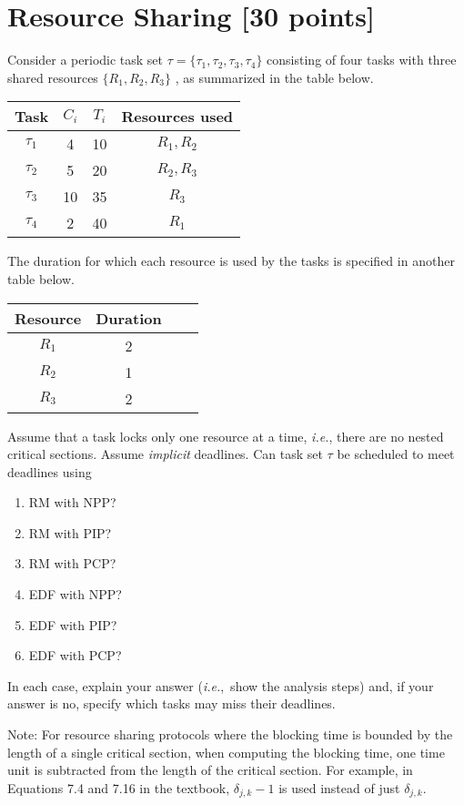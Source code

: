 \documentclass[12pt]{article}
\newcommand{\ie}{{\textit{i.e.}}}
\begin{document}
\section{Resource Sharing [30 points]}

Consider a periodic task set $\tau = \{\tau_1, \tau_2, \tau_3, \tau_4\}$
consisting of four tasks with three shared
resources $\{R_1, R_2, R_3\}$ , as summarized in the table below.
\begin{table}[h]
\begin{center}
\begin{tabular}{cccc}
\toprule
Task & $C_{i}$ & $T_{i}$ & Resources used \\ 
  \midrule
$\tau_{1}$ & 4 & 10 & $R_{1}, R_{2}$ \\
$\tau_{2}$ & 5 & 20 & $R_{2}, R_{3}$ \\
$\tau_{3}$ & 10 & 35 & $R_{3}$ \\
$\tau_{4}$ & 2 & 40 & $R_{1}$ \\ 
  \bottomrule
\end{tabular}
\end{center}
\end{table}
The duration for which each resource is used by the tasks is specified in
another table below.
\begin{table}[h]
\begin{center}
\begin{tabular}{cccc}
\toprule
Resource & Duration \\ \midrule
$R_{1}$ & 2 \\
$R_{2}$ & 1 \\
$R_{3}$ & 2 \\
\bottomrule
\end{tabular}
\end{center}
\end{table}
Assume that a task locks only one resource at a time,
\ie, there are no nested critical sections. Assume \emph{implicit} deadlines.
Can task set $\tau$ be scheduled to meet deadlines using
\begin{enumerate}
\item RM with NPP?
\item RM with PIP?
\item RM with PCP?
\item EDF with NPP?
\item EDF with PIP?
\item EDF with PCP?
\end{enumerate}
In each case, explain your answer (\ie,~show the analysis steps)
and, if your answer is no, specify which tasks may miss their deadlines.

Note: For resource sharing protocols where the blocking time is bounded by the
length of a single critical section, when computing the blocking time,
one time unit is subtracted from the length of the critical section.
For example, in Equations 7.4 and 7.16 in the textbook, $\delta_{j,k} - 1$ is
used instead of just $\delta_{j, k}$. 
\end{document}
